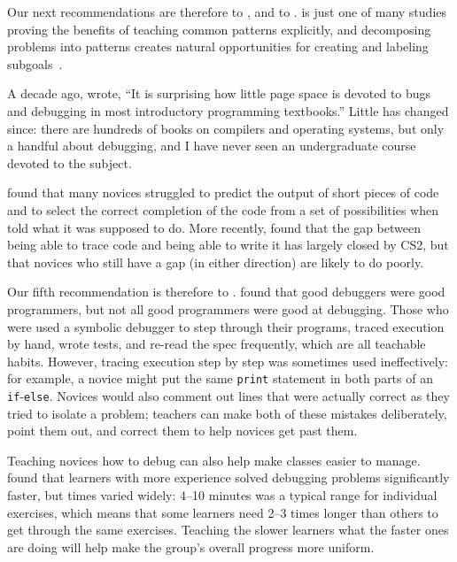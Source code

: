 Our next recommendations are therefore
to ,
and to .
\cite{Mull2007b} is just one of many studies proving the benefits of teaching common patterns explicitly,
and decomposing problems into patterns creates natural opportunities
for creating and labeling subgoals~\cite{Marg2012,Marg2016}.


A decade ago,
\cite{McCa2008} wrote,
``It is surprising how little page space is devoted to bugs and debugging
in most introductory programming textbooks.''
Little has changed since:
there are hundreds of books on compilers and operating systems,
but only a handful about debugging,
and I have never seen an undergraduate course devoted to the subject.

\cite{List2004,List2009} found that many novices struggled to predict the output of short pieces of code
and to select the correct completion of the code from a set of possibilities
when told what it was supposed to do.
More recently,
\cite{Harr2018} found that the gap between being able to trace code and being able to write it has largely closed by CS2,
but that novices who still have a gap (in either direction) are likely to do poorly.

Our fifth recommendation is therefore to .
\cite{Fitz2008,Murp2008} found that good debuggers were good programmers,
but not all good programmers were good at debugging.
Those who were used a symbolic debugger to step through their programs,
traced execution by hand,
wrote tests,
and re-read the spec frequently,
which are all teachable habits.
However,
tracing execution step by step was sometimes used ineffectively:
for example,
a novice might put the same \texttt{print} statement in both parts of an \texttt{if}-\texttt{else}.
Novices would also comment out lines that were actually correct as they tried to isolate a problem;
teachers can make both of these mistakes deliberately,
point them out,
and correct them to help novices get past them.

Teaching novices how to debug can also help make classes easier to manage.
\cite{Alqa2017} found that learners with more experience solved debugging problems significantly faster,
but times varied widely:
4--10 minutes was a typical range for individual exercises,
which means that some learners need 2--3 times longer than others to get through the same exercises.
Teaching the slower learners what the faster ones are doing
will help make the group's overall progress more uniform.

